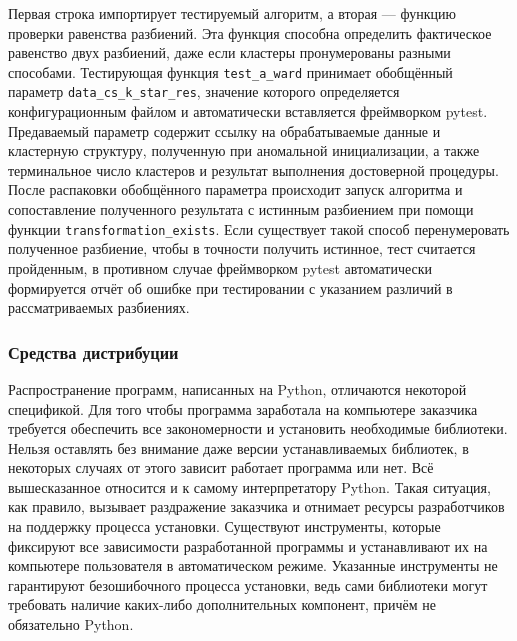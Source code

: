 \documentclass[12pt]{diploma}
\begin{document}
		
	
	Первая строка импортирует тестируемый алгоритм, а вторая --- функцию проверки равенства разбиений. Эта функция способна определить фактическое равенство двух разбиений, даже если кластеры пронумерованы разными способами. Тестирующая функция \texttt{test\_a\_ward} принимает обобщённый параметр \texttt{data\_cs\_k\_star\_res}, значение которого определяется конфигурационным файлом и автоматически вставляется фреймворком pytest. Предаваемый параметр содержит ссылку на обрабатываемые данные и кластерную структуру, полученную при аномальной инициализации, а также терминальное число кластеров и результат выполнения достоверной процедуры. После распаковки обобщённого параметра происходит запуск алгоритма \AWard и сопоставление полученного результата с истинным разбиением при помощи функции \texttt{transformation\_exists}. Если существует такой способ перенумеровать полученное разбиение, чтобы в точности получить истинное, тест считается пройденным, в противном случае фреймворком pytest автоматически формируется отчёт об ошибке при тестировании с указанием различий в рассматриваемых разбиениях.
	
	\subsubsection{Средства дистрибуции}
	Распространение программ, написанных на Python, отличаются некоторой спецификой. Для того  чтобы программа заработала на компьютере заказчика требуется обеспечить все закономерности и установить необходимые библиотеки. Нельзя оставлять без внимание даже версии устанавливаемых библиотек, в некоторых случаях от этого зависит работает программа или нет. Всё вышесказанное относится и к самому интерпретатору Python. Такая ситуация, как правило, вызывает раздражение заказчика и отнимает ресурсы разработчиков на поддержку процесса установки. Существуют инструменты, которые фиксируют все зависимости разработанной программы и устанавливают их на компьютере пользователя в автоматическом режиме. Указанные инструменты не гарантируют безошибочного процесса установки, ведь сами библиотеки могут требовать наличие каких-либо дополнительных компонент, причём не обязательно Python. 
	
\end{document}
